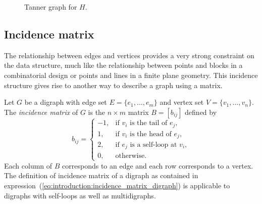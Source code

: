 \begin{figure}[!htbp]
\centering
{}
\caption{Tanner graph for $H$.}
\label{fig:introduction:tanner_graph}
\end{figure}



\subsection{Incidence matrix}

The relationship between edges and vertices provides a very strong
constraint on the data structure, much like the relationship between
points and blocks in a combinatorial design or points and lines in a
finite plane geometry. This incidence structure gives rise to another
way to describe a graph using a matrix.

Let $G$ be a digraph with edge set $E = \{ e_1, \dots, e_m \}$ and
vertex set $V = \{ v_1, \dots, v_n \}$. The \emph{incidence matrix} of
$G$ is the $n \times m$ matrix $B = [b_{ij}]$ defined by
%
\begin{equation}
\label{eq:introduction:incidence_matrix_digraph}
b_{ij}
=
\begin{cases}
-1, & \text{if $v_i$ is the tail of $e_j$}, \\
1,  & \text{if $v_i$ is the head of $e_j$}, \\
2,  & \text{if $e_j$ is a self-loop at $v_i$}, \\
0,  & \text{otherwise}.
\end{cases}
\end{equation}
%
Each column of $B$ corresponds to an edge and each row corresponds to
a vertex. The definition of incidence matrix of a digraph as contained
in expression~(\ref{eq:introduction:incidence_matrix_digraph}) is
applicable to digraphs with self-loops as well as multidigraphs.

